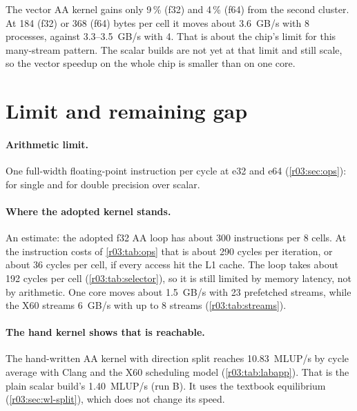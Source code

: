The vector AA kernel gains only 9\,\% (f32) and 4\,\% (f64) from the second cluster. At 184 (f32)
or 368 (f64) bytes per cell it moves about 3.6~GB/s with 8 processes, against 3.3--3.5~GB/s with
4. That is about the chip's limit for this many-stream pattern. The scalar builds are not yet at
that limit and still scale, so the vector speedup on the whole chip is smaller than on one core.

\section{Limit and remaining gap}\label{r03:sec:gap}

\paragraph{Arithmetic limit.} One full-width floating-point instruction per cycle at e32 and e64
(\cref{r03:sec:ops}):  for single and  for double precision over scalar.

\paragraph{Where the adopted kernel stands.} An estimate: the adopted f32 AA loop has about 300
instructions per 8 cells. At the instruction costs of \cref{r03:tab:ops} that is about 290 cycles
per iteration, or about 36 cycles per cell, if every access hit the L1 cache. The loop takes about
192 cycles per cell (\cref{r03:tab:selector}), so it is still limited by memory latency, not by
arithmetic. One core moves about 1.5~GB/s with 23 prefetched streams, while the X60 streams
6~GB/s with up to 8 streams (\cref{r03:tab:streams}).

\paragraph{The hand kernel shows that  is reachable.} The hand-written AA kernel with
direction split reaches 10.83~MLUP/s by cycle average with Clang and the X60 scheduling model
(\cref{r03:tab:labapp}). That is  the plain scalar build's 1.40~MLUP/s (run B). It uses
the textbook equilibrium (\cref{r03:sec:wl-split}), which does not change its speed.

